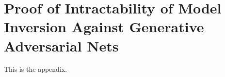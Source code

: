 \chapter{Proof of Intractability of Model Inversion Against Generative Adversarial Nets}
\label{appendix}
\thispagestyle{myheadings}

This is the appendix.